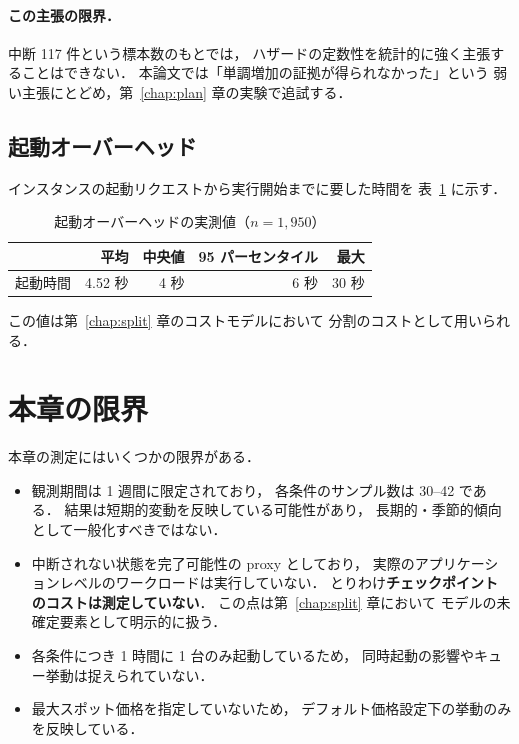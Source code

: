 \documentclass[11pt,a4paper]{ltjsreport}
\begin{document}
\paragraph{この主張の限界．}
中断 117 件という標本数のもとでは，
ハザードの定数性を統計的に強く主張することはできない．
本論文では「単調増加の証拠が得られなかった」という
弱い主張にとどめ，第~\ref{chap:plan} 章の実験で追試する．

\subsection{起動オーバーヘッド}

インスタンスの起動リクエストから実行開始までに要した時間を
表~\ref{tab:startup} に示す．

\begin{table}[htbp]
\centering
\caption{起動オーバーヘッドの実測値（$n = 1{,}950$）}
\label{tab:startup}
\small
\begin{tabular}{@{}lrrrr@{}}
\toprule
 & 平均 & 中央値 & 95 パーセンタイル & 最大 \\
\midrule
起動時間 & 4.52 秒 & 4 秒 & 6 秒 & 30 秒 \\
\bottomrule
\end{tabular}
\end{table}

この値は第~\ref{chap:split} 章のコストモデルにおいて
分割のコストとして用いられる．

\section{本章の限界}
\label{sec:limit_measure}

本章の測定にはいくつかの限界がある．

\begin{itemize}
  \item 観測期間は 1 週間に限定されており，
        各条件のサンプル数は 30--42 である．
        結果は短期的変動を反映している可能性があり，
        長期的・季節的傾向として一般化すべきではない．
  \item 中断されない状態を完了可能性の proxy としており，
        実際のアプリケーションレベルのワークロードは実行していない．
        とりわけ\textbf{チェックポイントのコストは測定していない}．
        この点は第~\ref{chap:split} 章において
        モデルの未確定要素として明示的に扱う．
  \item 各条件につき 1 時間に 1 台のみ起動しているため，
        同時起動の影響やキュー挙動は捉えられていない．
  \item 最大スポット価格を指定していないため，
        デフォルト価格設定下の挙動のみを反映している．
\end{itemize}
\end{document}
